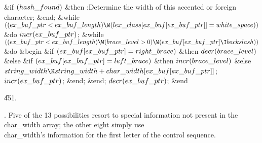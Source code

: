 \&{if} $(\\{hash\_found})$ \1\&{then}\5
:Determine the width of this accented or foreign character\X;\2\6
\&{end};\2\6
\&{while} $((\\{ex\_buf\_ptr}<\\{ex\_buf\_length})\W(\\{lex\_class}[\\{ex%
\_buf}[\\{ex\_buf\_ptr}]]=\\{white\_space}))$ \1\&{do}\5
$\\{incr}(\\{ex\_buf\_ptr})$;\2\6
\&{while} $((\\{ex\_buf\_ptr}<\\{ex\_buf\_length})\W(\\{brace\_level}>0)\W(%
\\{ex\_buf}[\\{ex\_buf\_ptr}]\I\\{backslash}))$ \1\&{do}\6
\&{begin} \6
\&{if} $(\\{ex\_buf}[\\{ex\_buf\_ptr}]=\\{right\_brace})$ \1\&{then}\5
$\\{decr}(\\{brace\_level})$\6
\4\&{else} \&{if} $(\\{ex\_buf}[\\{ex\_buf\_ptr}]=\\{left\_brace})$ \1\&{then}\5
$\\{incr}(\\{brace\_level})$\6
\4\&{else} $\\{string\_width}\K\\{string\_width}+\\{char\_width}[\\{ex\_buf}[%
\\{ex\_buf\_ptr}]]$;\2\2\6
$\\{incr}(\\{ex\_buf\_ptr})$;\6
\&{end};\2\6
\&{end};\2\6
$\\{decr}(\\{ex\_buf\_ptr})$;\6
\&{end}\par
\U451.\fi

.
Five of the 13 possibilities resort to special information not present
in the \\{char\_width} array; the other eight simply use \\{char\_width}'s
information for the first letter of the control sequence.

